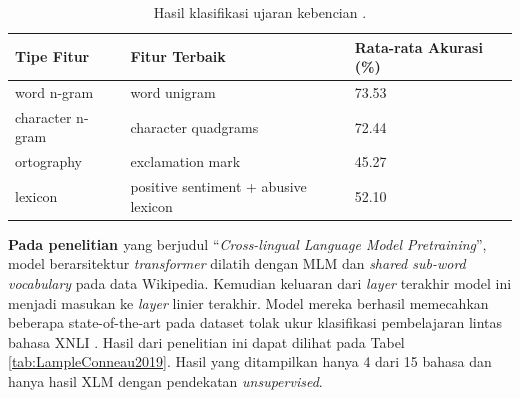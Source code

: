 \begin{table}[hbt]
    \centering
    \caption{Hasil klasifikasi ujaran kebencian \parencite{Ibrohim_Budi_2019}.}
    \begin{tabular}{|l|l|l|}
    \hline
    \textbf{Tipe Fitur} & \textbf{Fitur Terbaik} & \textbf{Rata-rata Akurasi (\%)} \\ \hline
    word n-gram              & word unigram                                    & 73.53                          \\ \hline
    character n-gram         & character quadgrams                             & 72.44                          \\ \hline
    ortography               & exclamation mark                                & 45.27                          \\ \hline
    lexicon                  & positive sentiment + abusive lexicon            & 52.10                          \\ \hline
    \end{tabular}
    \label{tab:Ibrohim_Budi_2019_2}
\end{table}

\textbf{Pada penelitian \parencite{LampleConneau2019}} yang berjudul “\textit{Cross-lingual Language Model Pretraining}”, model berarsitektur \textit{transformer} dilatih dengan MLM dan \textit{shared sub-word vocabulary} pada data Wikipedia. Kemudian keluaran dari \textit{layer} terakhir model ini menjadi masukan ke \textit{layer} linier terakhir. Model mereka berhasil memecahkan beberapa state-of-the-art pada  dataset tolak ukur klasifikasi pembelajaran lintas bahasa XNLI \parencite{Conneau_Rinott_Lample_Williams_Bowman_Schwenk_Stoyanov_2018}. Hasil dari penelitian ini dapat dilihat pada Tabel \ref{tab:LampleConneau2019}. Hasil yang ditampilkan hanya 4 dari 15 bahasa dan hanya hasil XLM dengan pendekatan \textit{unsupervised}.

